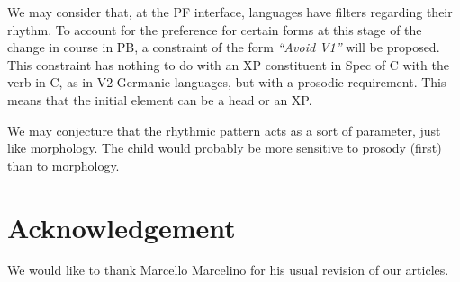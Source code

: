 \documentclass[output=paper,colorlinks,citecolor=brown]{langscibook}
\begin{document}
\z

We may consider that, at the PF interface, languages have filters regarding their rhythm. To account for the preference for certain forms at this stage of the change in course in PB, a constraint of the form \emph{“Avoid V1”} will be proposed.  This constraint has nothing to do with an XP constituent in Spec of C with the verb in C, as in V2 Germanic languages, but with a prosodic requirement. This means that the initial element can be a head or an XP.

We may conjecture that the rhythmic pattern acts as a sort of parameter, just like morphology. The child would probably be more sensitive to prosody (first) than to morphology.

\section*{Acknowledgement}
We would like to thank Marcello Marcelino for his usual revision of our articles.

\printbibliography[heading=subbibliography,notkeyword=this]
\end{document}
